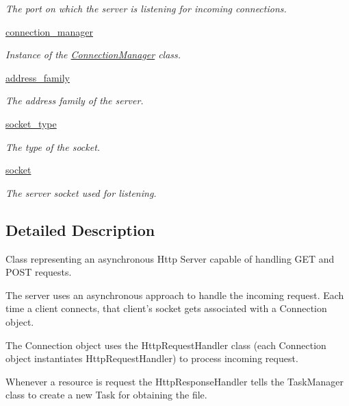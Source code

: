 \begin{DoxyCompactItemize}
\begin{DoxyCompactList}\small\item\em The port on which the server is listening for incoming connections. \end{DoxyCompactList}\item 
\hyperlink{class_async_http_server_1_1_async_http_server_aab2a41d288f15308d305bff00e922200}{connection\-\_\-manager}
\begin{DoxyCompactList}\small\item\em Instance of the \hyperlink{namespace_connection_manager}{Connection\-Manager} class. \end{DoxyCompactList}\item 
\hyperlink{class_async_http_server_1_1_async_http_server_ad6c600941d9ab1f0e5880290db2dcb93}{address\-\_\-family}
\begin{DoxyCompactList}\small\item\em The address family of the server. \end{DoxyCompactList}\item 
\hyperlink{class_async_http_server_1_1_async_http_server_ae703825864891b7c4f1f69eb541eb64f}{socket\-\_\-type}
\begin{DoxyCompactList}\small\item\em The type of the socket. \end{DoxyCompactList}\item 
\hypertarget{class_async_http_server_1_1_async_http_server_a8ce24f83f3acafe8756d1ba1ade13752}{\hyperlink{class_async_http_server_1_1_async_http_server_a8ce24f83f3acafe8756d1ba1ade13752}{socket}}\label{class_async_http_server_1_1_async_http_server_a8ce24f83f3acafe8756d1ba1ade13752}

\begin{DoxyCompactList}\small\item\em The server socket used for listening. \end{DoxyCompactList}\end{DoxyCompactItemize}


\subsection{Detailed Description}
Class representing an asynchronous Http Server capable of handling G\-E\-T and P\-O\-S\-T requests. 

The server uses an asynchronous approach to handle the incoming request. Each time a client connects, that client's socket gets associated with a Connection object.\par
 The Connection object uses the Http\-Request\-Handler class (each Connection object instantiates Http\-Request\-Handler) to process incoming request.\par
 Whenever a resource is request the Http\-Response\-Handler tells the Task\-Manager class to create a new Task for obtaining the file. 

